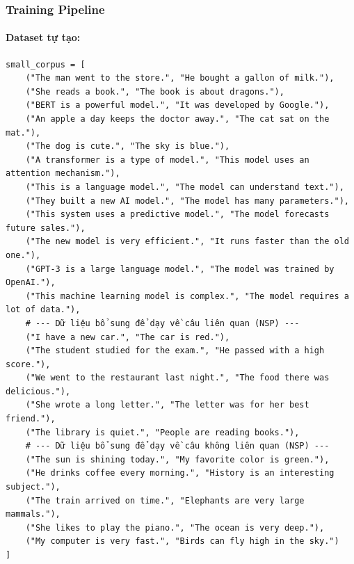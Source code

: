 \subsubsection{Training Pipeline}
\label{subsubsec:training_pipeline}

\paragraph{Dataset tự tạo:}
\begin{verbatim}
small_corpus = [
    ("The man went to the store.", "He bought a gallon of milk."),
    ("She reads a book.", "The book is about dragons."),
    ("BERT is a powerful model.", "It was developed by Google."),
    ("An apple a day keeps the doctor away.", "The cat sat on the mat."),
    ("The dog is cute.", "The sky is blue."),
    ("A transformer is a type of model.", "This model uses an attention mechanism."),
    ("This is a language model.", "The model can understand text."),
    ("They built a new AI model.", "The model has many parameters."),
    ("This system uses a predictive model.", "The model forecasts future sales."),
    ("The new model is very efficient.", "It runs faster than the old one."),
    ("GPT-3 is a large language model.", "The model was trained by OpenAI."),
    ("This machine learning model is complex.", "The model requires a lot of data."),
    # --- Dữ liệu bổ sung để dạy về câu liên quan (NSP) ---
    ("I have a new car.", "The car is red."),
    ("The student studied for the exam.", "He passed with a high score."),
    ("We went to the restaurant last night.", "The food there was delicious."),
    ("She wrote a long letter.", "The letter was for her best friend."),
    ("The library is quiet.", "People are reading books."),
    # --- Dữ liệu bổ sung để dạy về câu không liên quan (NSP) ---
    ("The sun is shining today.", "My favorite color is green."),
    ("He drinks coffee every morning.", "History is an interesting subject."),
    ("The train arrived on time.", "Elephants are very large mammals."),
    ("She likes to play the piano.", "The ocean is very deep."),
    ("My computer is very fast.", "Birds can fly high in the sky.")
]
\end{verbatim}

